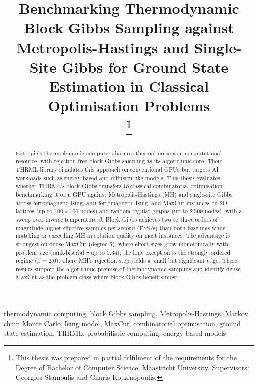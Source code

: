 \documentclass[conference]{IEEEtran}
\begin{document}
\title{Benchmarking Thermodynamic Block Gibbs Sampling against Metropolis-Hastings and Single-Site Gibbs for Ground State Estimation in Classical Optimisation Problems\\
  \thanks{This thesis was prepared in partial fulfilment of the requirements for the Degree of Bachelor of Computer Science, Maastricht University. Supervisors: Georgios Stamoulis and Charis Kouzinopoulis.}
}

\author{
}

\maketitle

\begin{abstract}
  Extropic's thermodynamic computers harness thermal noise as a computational resource, with rejection-free block Gibbs sampling as its algorithmic core. Their THRML library simulates this approach on conventional GPUs but targets AI workloads such as energy-based and diffusion-like models. This thesis evaluates whether THRML's block Gibbs transfers to classical combinatorial optimisation, benchmarking it on a GPU against Metropolis-Hastings (MH) and single-site Gibbs across ferromagnetic Ising, anti-ferromagnetic Ising, and MaxCut instances on 2D lattices (up to $100{\times}100$ nodes) and random regular graphs (up to 2,500 nodes), with a sweep over inverse temperature $\beta$. Block Gibbs achieves two to three orders of magnitude higher effective samples per second (ESS/s) than both baselines while matching or exceeding MH in solution quality on most instances. The advantage is strongest on dense MaxCut (degree-5), where effect sizes grow monotonically with problem size (rank-biserial $r$ up to 0.34); the lone exception is the strongly ordered regime ($\beta = 2.0$), where MH's rejection step yields a small but significant edge. These results support the algorithmic premise of thermodynamic sampling and identify dense MaxCut as the problem class where block Gibbs benefits most.
\end{abstract}

\begin{IEEEkeywords}
  thermodynamic computing, block Gibbs sampling, Metropolis-Hastings, Markov chain Monte Carlo, Ising model, MaxCut, combinatorial optimisation, ground state estimation, THRML, probabilistic computing, energy-based models
\end{IEEEkeywords}
\end{document}

